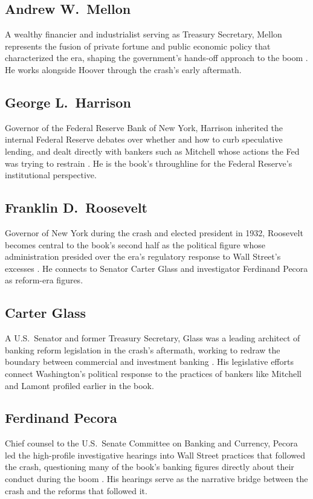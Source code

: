 \documentclass[11pt]{article}
\begin{document}
\subsection{Andrew W.\ Mellon}
A wealthy financier and industrialist serving as Treasury Secretary, Mellon
represents the fusion of private fortune and public economic policy that
characterized the era, shaping the government's hands-off approach to the boom
\autocite{supersummary1929}. He works alongside Hoover through the crash's early
aftermath.

\subsection{George L.\ Harrison}
Governor of the Federal Reserve Bank of New York, Harrison inherited the internal
Federal Reserve debates over whether and how to curb speculative lending, and dealt
directly with bankers such as Mitchell whose actions the Fed was trying to restrain
\autocite{supersummary1929}. He is the book's throughline for the Federal Reserve's
institutional perspective.

\subsection{Franklin D.\ Roosevelt}
Governor of New York during the crash and elected president in 1932, Roosevelt
becomes central to the book's second half as the political figure whose
administration presided over the era's regulatory response to Wall Street's excesses
\autocite{supersummary1929,libraryjournal1929}. He connects to Senator Carter Glass
and investigator Ferdinand Pecora as reform-era figures.

\subsection{Carter Glass}
A U.S.\ Senator and former Treasury Secretary, Glass was a leading architect of
banking reform legislation in the crash's aftermath, working to redraw the boundary
between commercial and investment banking \autocite{libraryjournal1929}. His
legislative efforts connect Washington's political response to the practices of
bankers like Mitchell and Lamont profiled earlier in the book.

\subsection{Ferdinand Pecora}
Chief counsel to the U.S.\ Senate Committee on Banking and Currency, Pecora led the
high-profile investigative hearings into Wall Street practices that followed the
crash, questioning many of the book's banking figures directly about their conduct
during the boom \autocite{libraryjournal1929,dailyeconomy1929}. His hearings serve
as the narrative bridge between the crash and the reforms that followed it.
\end{document}

